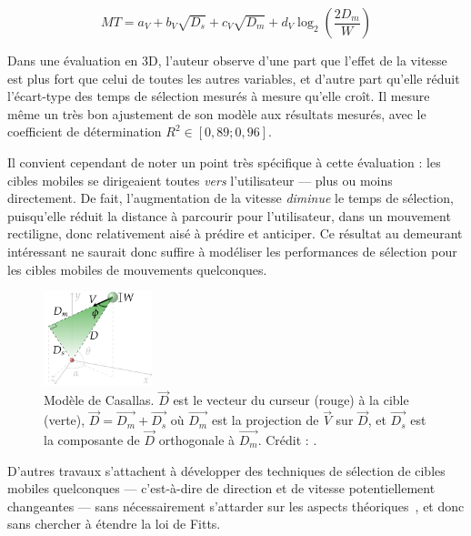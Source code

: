 	\begin{equation}
		\label{eq:casallas}
		MT = a_{V} + b_{V}\sqrt{D_{s}} +  c_{V}\sqrt{D_{m}} + d_{V} \log_{2} \left( \frac{2D_{m}}{W} \right)
	\end{equation}
	
	Dans une évaluation en 3D, l'auteur observe d'une part que l'effet de la vitesse est plus fort que celui de toutes les autres variables, et d'autre part qu'elle réduit l'écart-type des temps de sélection mesurés à mesure qu'elle croît. Il mesure même un très bon ajustement de son modèle aux résultats mesurés, avec le coefficient de détermination $R^{2} \in [0,89 ; 0,96]$.
	
	Il convient cependant de noter un point très spécifique à cette évaluation : les cibles mobiles se dirigeaient toutes \emph{vers} l'utilisateur --- plus ou moins directement. De fait, l'augmentation de la vitesse \emph{diminue} le temps de sélection, puisqu'elle réduit la distance à parcourir pour l'utilisateur, dans un mouvement rectiligne, donc relativement aisé à prédire et anticiper. Ce résultat au demeurant intéressant ne saurait donc suffire à modéliser les performances de sélection pour les cibles mobiles de mouvements quelconques.
	
	\begin{figure}
		\centering
		\includegraphics[width=0.28\textwidth]{figures/ch2/casallas}
		\caption[Paramètres du modèle de Casallas]{Modèle de Casallas. $\vec{D}$ est le vecteur du curseur (rouge) à la cible (verte), $\vec{D} = \vec{D_{m}} + \vec{D_{s}}$ où $\vec{D_{m}}$ est la projection de $\vec{V}$ sur $\vec{D}$, et $\vec{D_{s}}$ est la composante de $\vec{D}$ orthogonale à $\vec{D_{m}}$. Crédit : \cite{casallas2015prediction}.}
		\label{fig:casallas}
	\end{figure}
	
	D'autres travaux s'attachent à développer des techniques de sélection de cibles mobiles \og quelconques \fg{} --- c'est-à-dire de direction et de vitesse potentiellement changeantes --- sans nécessairement s'attarder sur les aspects théoriques~\cite{hasan2011comet, ortega2013hook}, et donc sans chercher à étendre la loi de Fitts.
	
